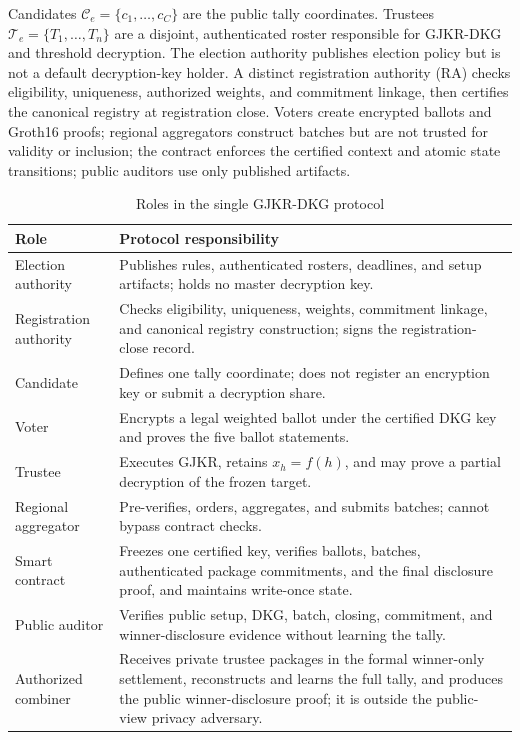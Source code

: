 \documentclass[pdflatex,sn-mathphys-num]{sn-jnl}%
\theoremstyle{thmstyleone}%
\theoremstyle{thmstyletwo}%
\theoremstyle{thmstylethree}%
\begin{document}
Candidates $\mathcal C_e=\{c_1,\ldots,c_C\}$ are the public tally
coordinates.  Trustees $\mathcal T_e=\{T_1,\ldots,T_n\}$ are a disjoint,
authenticated roster responsible for GJKR-DKG and threshold decryption.  The
election authority publishes election policy but is not a default
decryption-key holder.  A distinct registration authority (RA) checks
eligibility, uniqueness, authorized weights, and commitment linkage, then
certifies the canonical registry at registration close.  Voters create
encrypted ballots and Groth16 proofs;
regional aggregators construct batches but are not trusted for validity or
inclusion; the contract enforces the certified context and atomic state
transitions; public auditors use only published artifacts.

\begin{table}[htbp]
\centering
\caption{Roles in the single GJKR-DKG protocol}
\label{tab:entities}
\small
\begin{tabular}{p{}p{}}
\toprule
Role & Protocol responsibility \\
\midrule
Election authority & Publishes rules, authenticated rosters, deadlines, and setup artifacts; holds no master decryption key. \\
Registration authority & Checks eligibility, uniqueness, weights, commitment linkage, and canonical registry construction; signs the registration-close record. \\
Candidate & Defines one tally coordinate; does not register an encryption key or submit a decryption share. \\
Voter & Encrypts a legal weighted ballot under the certified DKG key and proves the five ballot statements. \\
Trustee & Executes GJKR, retains $x_h=f(h)$, and may prove a partial decryption of the frozen target. \\
Regional aggregator & Pre-verifies, orders, aggregates, and submits batches; cannot bypass contract checks. \\
Smart contract & Freezes one certified key, verifies ballots, batches, authenticated package commitments, and the final disclosure proof, and maintains write-once state. \\
Public auditor & Verifies public setup, DKG, batch, closing, commitment, and winner-disclosure evidence without learning the tally. \\
Authorized combiner & Receives private trustee packages in the formal winner-only settlement, reconstructs and learns the full tally, and produces the public winner-disclosure proof; it is outside the public-view privacy adversary. \\
\bottomrule
\end{tabular}
\end{table}
\end{document}
